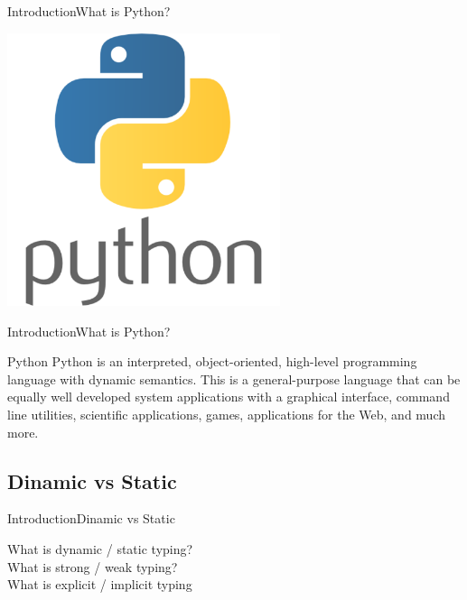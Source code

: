 \documentclass[10pt]{beamer}
\begin{document}
\begin{frame}{Introduction}{What is Python?}
	\begin{center}
		\includegraphics[width=0.6\textwidth]{pictures/python.png}
	\end{center}
\end{frame}

\begin{frame}{Introduction}{What is Python?}
	\begin{block}{Python}
		Python is an interpreted, object-oriented, high-level programming language with dynamic semantics.  This is a general-purpose language that can be equally well developed system applications with a graphical interface, command line utilities, scientific applications, games, applications for the Web, and much more.	
	\end{block}
\end{frame}

\subsection{Dinamic vs Static}
\begin{frame}[fragile]{Introduction}{Dinamic vs Static}
	\begin{center}
		\LARGE What is dynamic / static typing? \\
		\pause
		\LARGE What is strong / weak typing? \\
		\pause 
		\LARGE What is explicit / implicit typing
	\end{center}
\end{frame}
\end{document}
